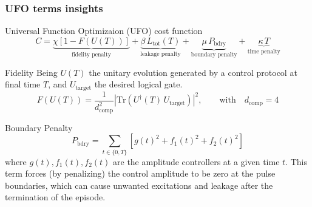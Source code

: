 \documentclass{beamer}
\begin{document}
\begin{frame}
    \frametitle{UFO terms insights}
\begin{alertblock}{Universal Function Optimizaion (UFO) cost function}
    \scriptsize
\[
C=
\underbrace{\chi\!\left[1-F(U(T))\right]}_{\text{fidelity penalty}}
+\underbrace{\beta\,L_{\mathrm{tot}}(T)}_{\text{leakage penalty}}
+\underbrace{\mu\,P_{\mathrm{bdry}}}_{\text{boundary penalty}}
+\underbrace{\kappa\,T}_{\text{time penalty}}
\]
\end{alertblock}

\vspace{0.2em}

\scriptsize
\begin{block}{Fidelity}
Being $U(T)$ the unitary evolution generated by a control protocol at final time $T$, and $U_{\mathrm{target}}$ the desired logical gate.
\[F(U(T))=\frac{1}{d_{\mathrm{comp}}^2}\left|\mathrm{Tr}\!\left(U^\dagger(T)\,U_{\mathrm{target}}\right)\right|^2, \qquad \mathrm{with} \quad d_{\mathrm{comp}}=4 \]
\end{block}

\begin{block}{Boundary Penalty}
    \[
    P_{\mathrm{bdry}}=\sum_{t\in\{0,T\}}\!\left[g(t)^2+f_1(t)^2+f_2(t)^2\right]
    \]
    where \(g(t), f_1(t), f_2(t)\) are the amplitude controllers at a given time \(t\). 
    This term forces (by penalizing) the control amplitude to be zero at the pulse boundaries, which can cause unwanted excitations and leakage after the termination of the episode.
\end{block}
\let\thefootnote\relax{}
\end{frame}
\end{document}
